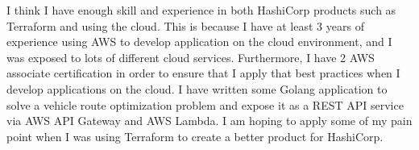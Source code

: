 \documentclass[11pt, a4paper]{awesome-cv}
\begin{document}
\begin{cvletter}
I think I have enough skill and experience in both HashiCorp products such as Terraform and using the cloud. This is because I have at least 3 years of experience using AWS to develop application on the cloud environment, and I was exposed to lots of different cloud services. Furthermore, I have 2 AWS associate certification in order to ensure that I apply that best practices when I develop applications on the cloud. I have written some Golang application to solve a vehicle route optimization problem and expose it as a REST API service via AWS API Gateway and AWS Lambda. I am hoping to apply some of my pain point when I was using Terraform to create a better product for HashiCorp.

\end{cvletter}


\makeletterclosing
\end{document}
